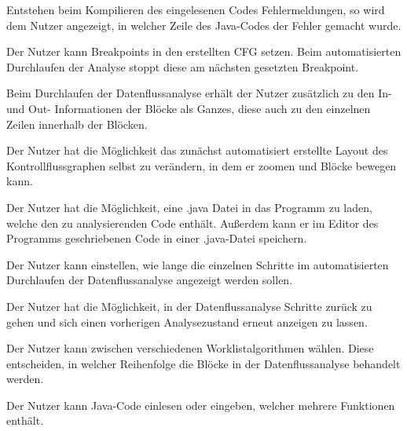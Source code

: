 Entstehen beim Kompilieren des eingelesenen Codes Fehlermeldungen, so wird dem Nutzer angezeigt, in welcher Zeile des Java-Codes der Fehler gemacht wurde.

Der Nutzer kann Breakpoints in den erstellten CFG setzen. Beim automatisierten Durchlaufen der Analyse stoppt diese am nächsten gesetzten Breakpoint.

Beim Durchlaufen der Datenflussanalyse erhält der Nutzer zusätzlich zu den In- und Out-
Informationen der Blöcke als Ganzes, diese auch zu den einzelnen Zeilen
innerhalb der Blöcken.

Der Nutzer hat die Möglichkeit das zunächst automatisiert erstellte Layout des
Kontrollflussgraphen selbst zu verändern, in dem er zoomen und Blöcke bewegen kann.

Der Nutzer hat die Möglichkeit, eine .java Datei in das Programm zu laden, welche
den zu analysierenden Code enthält. Außerdem kann er im Editor des Programms geschriebenen Code in einer .java-Datei speichern.

Der Nutzer kann einstellen, wie lange die einzelnen Schritte im automatisierten
Durchlaufen der Datenflussanalyse angezeigt werden sollen.

Der Nutzer hat die Möglichkeit, in der Datenflussanalyse Schritte zurück zu gehen
und sich einen vorherigen Analysezustand erneut anzeigen zu lassen.

Der Nutzer kann zwischen verschiedenen Worklistalgorithmen wählen. Diese
entscheiden, in welcher Reihenfolge die Blöcke in der Datenflussanalyse behandelt
werden.

Der Nutzer kann Java-Code einlesen oder eingeben, welcher mehrere Funktionen
enthält.

